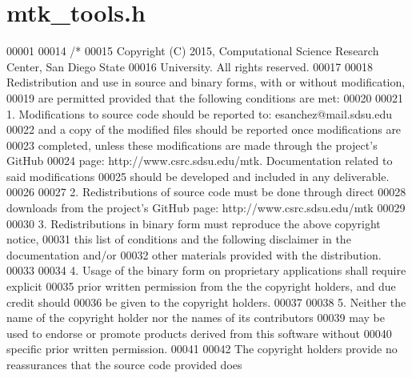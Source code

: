 \hypertarget{mtk__tools_8h_source}{\section{mtk\+\_\+tools.\+h}
\label{mtk__tools_8h_source}
}

\begin{DoxyCode}
00001 
00014 \textcolor{comment}{/*}
00015 \textcolor{comment}{Copyright (C) 2015, Computational Science Research Center, San Diego State}
00016 \textcolor{comment}{University. All rights reserved.}
00017 \textcolor{comment}{}
00018 \textcolor{comment}{Redistribution and use in source and binary forms, with or without modification,}
00019 \textcolor{comment}{are permitted provided that the following conditions are met:}
00020 \textcolor{comment}{}
00021 \textcolor{comment}{1. Modifications to source code should be reported to: esanchez@mail.sdsu.edu}
00022 \textcolor{comment}{and a copy of the modified files should be reported once modifications are}
00023 \textcolor{comment}{completed, unless these modifications are made through the project's GitHub}
00024 \textcolor{comment}{page: http://www.csrc.sdsu.edu/mtk. Documentation related to said modifications}
00025 \textcolor{comment}{should be developed and included in any deliverable.}
00026 \textcolor{comment}{}
00027 \textcolor{comment}{2. Redistributions of source code must be done through direct}
00028 \textcolor{comment}{downloads from the project's GitHub page: http://www.csrc.sdsu.edu/mtk}
00029 \textcolor{comment}{}
00030 \textcolor{comment}{3. Redistributions in binary form must reproduce the above copyright notice,}
00031 \textcolor{comment}{this list of conditions and the following disclaimer in the documentation and/or}
00032 \textcolor{comment}{other materials provided with the distribution.}
00033 \textcolor{comment}{}
00034 \textcolor{comment}{4. Usage of the binary form on proprietary applications shall require explicit}
00035 \textcolor{comment}{prior written permission from the the copyright holders, and due credit should}
00036 \textcolor{comment}{be given to the copyright holders.}
00037 \textcolor{comment}{}
00038 \textcolor{comment}{5. Neither the name of the copyright holder nor the names of its contributors}
00039 \textcolor{comment}{may be used to endorse or promote products derived from this software without}
00040 \textcolor{comment}{specific prior written permission.}
00041 \textcolor{comment}{}
00042 \textcolor{comment}{The copyright holders provide no reassurances that the source code provided does}

\end{DoxyCode}
